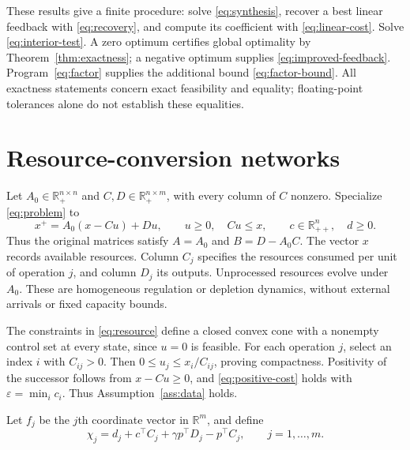 \documentclass[10pt]{article}
\newcommand{\R}{\mathbb R}
\begin{document}
These results give a finite procedure: solve \eqref{eq:synthesis}, recover a best linear feedback with \eqref{eq:recovery}, and compute its coefficient with \eqref{eq:linear-cost}. Solve \eqref{eq:interior-test}. A zero optimum certifies global optimality by Theorem~\ref{thm:exactness}; a negative optimum supplies \eqref{eq:improved-feedback}. Program~\eqref{eq:factor} supplies the additional bound \eqref{eq:factor-bound}. All exactness statements concern exact feasibility and equality; floating-point tolerances alone do not establish these equalities.

\section{Resource-conversion networks}

Let $A_0\in\R_+^{n\times n}$ and $C,D\in\R_+^{n\times m}$, with every column of $C$ nonzero. Specialize \eqref{eq:problem} to
\begin{equation}
 x^+=A_0(x-Cu)+Du,\qquad u\ge0,\quad Cu\le x,
 \qquad c\in\R_{++}^n,\quad d\ge0.
 \label{eq:resource}
\end{equation}
Thus the original matrices satisfy $A=A_0$ and $B=D-A_0C$. The vector $x$ records available resources. Column $C_j$ specifies the resources consumed per unit of operation $j$, and column $D_j$ its outputs. Unprocessed resources evolve under $A_0$. These are homogeneous regulation or depletion dynamics, without external arrivals or fixed capacity bounds.

The constraints in \eqref{eq:resource} define a closed convex cone with a nonempty control set at every state, since $u=0$ is feasible. For each operation $j$, select an index $i$ with $C_{ij}>0$. Then $0\le u_j\le x_i/C_{ij}$, proving compactness. Positivity of the successor follows from $x-Cu\ge0$, and \eqref{eq:positive-cost} holds with $\varepsilon=\min_i c_i$. Thus Assumption~\ref{ass:data} holds.

Let $f_j$ be the $j$th coordinate vector in $\R^m$, and define
\begin{equation}
 \chi_j=d_j+c^\top C_j+\gamma p^\top D_j-p^\top C_j,
 \qquad j=1,\ldots,m.
 \label{eq:operation-test}
\end{equation}
\end{document}
